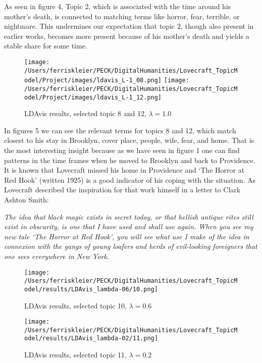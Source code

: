 As seen in figure 4, Topic 2, which is associated with the time around his mother’s death, is 
connected to matching terms like horror, fear, terrible, or nightmare. This undermines our expectation 
that topic 2, though also present in earlier works, becomes more present because of his mother’s death 
and yields a stable share for some time.\\

\begin{figure}[ht]
    \centering
    \texttt{[image: /Users/ferriskleier/PECK/DigitalHumanities/Lovecraft\_TopicModel/Project/images/ldavis\_L-1\_08.png]}
    \texttt{[image: /Users/ferriskleier/PECK/DigitalHumanities/Lovecraft\_TopicModel/Project/images/ldavis\_L-1\_12.png]}
    \caption{LDAvis results, selected topic 8 and 12, $\lambda=1.0$}
    \label{fig:mesh5}
\end{figure}

In figures 5 we can see the relevant terms for topics 8 and 12, which match closest to his stay 
in Brooklyn, cover place, people, wife, fear, and home. That is the most interesting insight because 
as we have seen in figure 1 one can find patterns in the time frames when he moved to Brooklyn and 
back to Providence. It is known that Lovecraft missed his home in Providence and ‘The Horror at 
Red Hook’ (written 1925) is a good indicator of his coping with the situation. As Lovecraft 
described the inspiration for that work himself in a letter to Clark Ashton Smith:

\begin{displayquote}
    \textit{The idea that black magic exists in secret today, or that hellish antique rites still exist in obscurity, is one that I have used and shall use again. When you see my new tale ‘The Horror at Red Hook’, you will see what use I make of the idea in connexion with the gangs of young loafers and herds of evil-looking foreigners that one sees everywhere in New York.}
\end{displayquote}

\begin{figure}[ht]
    \centering
    \texttt{[image: /Users/ferriskleier/PECK/DigitalHumanities/Lovecraft\_TopicModel/results/LDAvis\_lambda-06/10.png]}
    \caption{LDAvis results, selected topic 10, $\lambda=0.6$}
    \label{fig:mesh6}
\end{figure}

\begin{figure}[ht]
    \centering
    \texttt{[image: /Users/ferriskleier/PECK/DigitalHumanities/Lovecraft\_TopicModel/results/LDAvis\_lambda-02/11.png]}
    \caption{LDAvis results, selected topic 11, $\lambda=0.2$}
    \label{fig:mesh7}
\end{figure}

